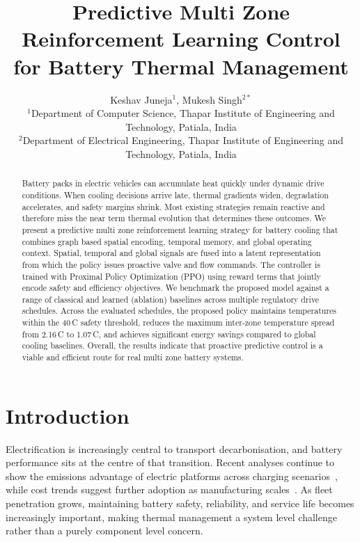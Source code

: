\documentclass[twocolumn]{article}
\begin{document}
\title{Predictive Multi Zone Reinforcement Learning Control for Battery Thermal Management}

\author{Keshav Juneja$^{1}$, Mukesh Singh$^{2*}$\\
\small $^{1}$Department of Computer Science, Thapar Institute of Engineering and Technology, Patiala, India\\
\small $^{2}$Department of Electrical Engineering, Thapar Institute of Engineering and Technology, Patiala, India\\}

\maketitle

\begin{abstract}
Battery packs in electric vehicles can accumulate heat quickly under dynamic drive conditions.
When cooling decisions arrive late, thermal gradients widen, degradation accelerates, and safety margins shrink.
Most existing strategies remain reactive and therefore miss the near term thermal evolution that determines these outcomes.
We present a predictive multi zone reinforcement learning strategy for battery cooling that combines graph based spatial encoding, temporal memory, and global operating context.
Spatial, temporal and global signals are fused into a latent representation from which the policy issues proactive valve and flow commands.
The controller is trained with Proximal Policy Optimization (PPO) using reward terms that jointly encode safety and efficiency objectives.
We benchmark the proposed model against a range of classical and learned (ablation) baselines across multiple regulatory drive schedules.
Across the evaluated schedules, the proposed policy maintains temperatures within the 40\,\textdegree{}C safety threshold, reduces the maximum inter-zone temperature spread from 2.16\,\textdegree{}C to 1.07\,\textdegree{}C, and achieves significant energy savings compared to global cooling baselines.
Overall, the results indicate that proactive predictive control is a viable and efficient route for real multi zone battery systems.
\end{abstract}

\section*{Introduction}

Electrification is increasingly central to transport decarbonisation, and battery performance sits at the centre of that transition. Recent analyses continue to show the emissions advantage of electric platforms across charging scenarios~\cite{Welsby2021,Bersalli2023,LCA_EV2023}, while cost trends suggest further adoption as manufacturing scales~\cite{Link2024}. As fleet penetration grows, maintaining battery safety, reliability, and service life becomes increasingly important, making thermal management a system level challenge rather than a purely component level concern.
\end{document}
